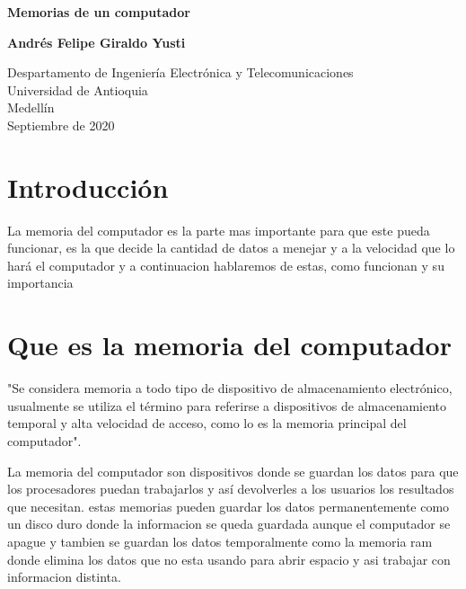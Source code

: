 \documentclass{article}
\begin{document}
\begin{titlepage}
    \begin{center}
        \vspace*{1cm}
            
        \Huge
        \textbf{Memorias de un computador}
            
        \vspace{0.5cm}
            
        \vspace{1.5cm}
            
        \textbf{Andrés Felipe Giraldo Yusti}
            
        \vfill
            
        \vspace{0.8cm}
            
        \Large
        Despartamento de Ingeniería Electrónica y Telecomunicaciones\\
        Universidad de Antioquia\\
        Medellín\\
        Septiembre de 2020
            
    \end{center}
\end{titlepage}

\tableofcontents

\section{Introducción}
La memoria del computador es la parte mas importante para que este pueda funcionar, es la que decide la cantidad de datos a menejar y a la velocidad que lo hará el computador y a continuacion hablaremos de estas, como funcionan y su importancia

\section{Que es la memoria del computador} \label{Que es la memoria del computador}


"Se considera memoria a todo tipo de dispositivo de almacenamiento electrónico, usualmente se utiliza el término para referirse a dispositivos de almacenamiento temporal y alta velocidad de acceso, como lo es la memoria principal del computador".\cite{knuth-fa}

\vspace{0.5cm}

La memoria del computador son dispositivos donde se guardan los datos para que los procesadores puedan trabajarlos y así devolverles a los usuarios los resultados que necesitan. estas memorias pueden guardar los datos permanentemente como un disco duro donde la informacion se queda guardada aunque el computador se apague y tambien se guardan los datos temporalmente como la memoria ram donde elimina los datos que no esta usando para abrir espacio y asi trabajar con informacion distinta.
\clearpage
\end{document}
